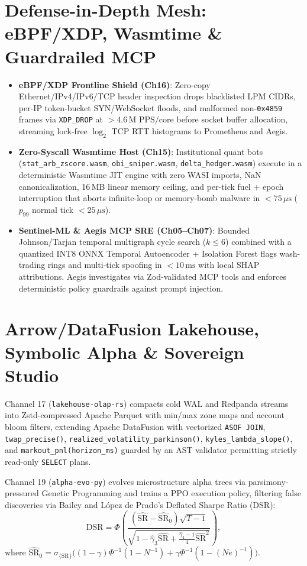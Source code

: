 \documentclass[10pt,twocolumn]{article}
\begin{document}
\section{Defense-in-Depth Mesh: eBPF/XDP, Wasmtime \& Guardrailed MCP}
\begin{itemize}
  \item \textbf{eBPF/XDP Frontline Shield (Ch16)}: Zero-copy Ethernet/IPv4/IPv6/TCP header inspection drops blacklisted LPM CIDRs, per-IP token-bucket SYN/WebSocket floods, and malformed non-\texttt{0x4859} frames via \texttt{XDP\_DROP} at $>4.6\,\text{M PPS/core}$ before socket buffer allocation, streaming lock-free $\log_2$ TCP RTT histograms to Prometheus and Aegis.
  \item \textbf{Zero-Syscall Wasmtime Host (Ch15)}: Institutional quant bots (\texttt{stat\_arb\_zscore.wasm}, \texttt{obi\_sniper.wasm}, \texttt{delta\_hedger.wasm}) execute in a deterministic Wasmtime JIT engine with zero WASI imports, NaN canonicalization, 16\,MB linear memory ceiling, and per-tick fuel + epoch interruption that aborts infinite-loop or memory-bomb malware in $<75\,\mu\text{s}$ ($p_{99}$ normal tick $<25\,\mu\text{s}$).
  \item \textbf{Sentinel-ML \& Aegis MCP SRE (Ch05--Ch07)}: Bounded Johnson/Tarjan temporal multigraph cycle search ($k \le 6$) combined with a quantized INT8 ONNX Temporal Autoencoder + Isolation Forest flags wash-trading rings and multi-tick spoofing in $<10\,\text{ms}$ with local SHAP attributions. Aegis investigates via Zod-validated MCP tools and enforces deterministic policy guardrails against prompt injection.
\end{itemize}

\section{Arrow/DataFusion Lakehouse, Symbolic Alpha \& Sovereign Studio}
Channel 17 (\texttt{lakehouse-olap-rs}) compacts cold WAL and Redpanda streams into Zstd-compressed Apache Parquet with min/max zone maps and account bloom filters, extending Apache DataFusion with vectorized \texttt{ASOF JOIN}, \texttt{twap\_precise()}, \texttt{realized\_volatility\_parkinson()}, \texttt{kyles\_lambda\_slope()}, and \texttt{markout\_pnl(horizon\_ms)} guarded by an AST validator permitting strictly read-only \texttt{SELECT} plans.

Channel 19 (\texttt{alpha-evo-py}) evolves microstructure alpha trees via parsimony-pressured Genetic Programming and trains a PPO execution policy, filtering false discoveries via Bailey and L\'opez de Prado's Deflated Sharpe Ratio (DSR):
\begin{equation}
  \mathrm{DSR} = \Phi\!\left( \frac{(\widehat{\mathrm{SR}} - \widehat{\mathrm{SR}}_0)\sqrt{T - 1}}{\sqrt{1 - \hat{\gamma}_3 \widehat{\mathrm{SR}} + \frac{\hat{\gamma}_4 - 1}{4}\widehat{\mathrm{SR}}^2}} \right),
\end{equation}
where $\widehat{\mathrm{SR}}_0 = \sigma_{\{\mathrm{SR}\}}\big((1-\gamma)\Phi^{-1}(1 - N^{-1}) + \gamma\Phi^{-1}(1 - (Ne)^{-1})\big)$.
\end{document}
